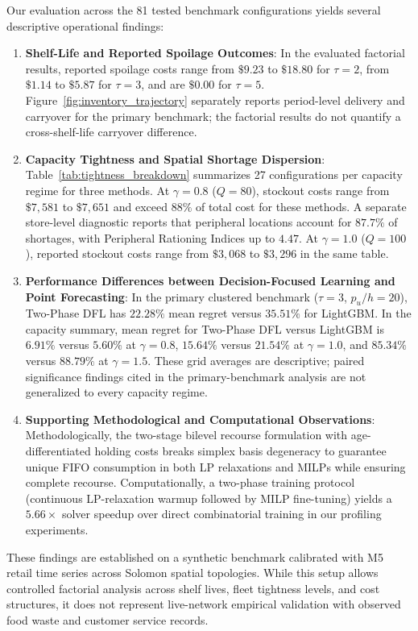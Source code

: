 \documentclass[11pt,a4paper]{article}
\theoremstyle{definition}
\theoremstyle{remark}
\begin{document}
Our evaluation across the 81 tested benchmark configurations yields several descriptive operational findings:
\begin{enumerate}[label=(\roman*)]
    \item \textbf{Shelf-Life and Reported Spoilage Outcomes}: In the evaluated factorial results, reported spoilage costs range from $\$9.23$ to $\$18.80$ for $\tau=2$, from $\$1.14$ to $\$5.87$ for $\tau=3$, and are $\$0.00$ for $\tau=5$. Figure~\ref{fig:inventory_trajectory} separately reports period-level delivery and carryover for the primary benchmark; the factorial results do not quantify a cross-shelf-life carryover difference.
    \item \textbf{Capacity Tightness and Spatial Shortage Dispersion}: Table~\ref{tab:tightness_breakdown} summarizes 27 configurations per capacity regime for three methods. At $\gamma=0.8$ ($Q=80$), stockout costs range from $\$7,581$ to $\$7,651$ and exceed $88\%$ of total cost for these methods. A separate store-level diagnostic reports that peripheral locations account for $87.7\%$ of shortages, with Peripheral Rationing Indices up to $4.47$. At $\gamma=1.0$ ($Q=100$), reported stockout costs range from $\$3,068$ to $\$3,296$ in the same table.
    \item \textbf{Performance Differences between Decision-Focused Learning and Point Forecasting}: In the primary clustered benchmark ($\tau=3$, $p_u/h=20$), Two-Phase DFL has $22.28\%$ mean regret versus $35.51\%$ for LightGBM. In the capacity summary, mean regret for Two-Phase DFL versus LightGBM is $6.91\%$ versus $5.60\%$ at $\gamma=0.8$, $15.64\%$ versus $21.54\%$ at $\gamma=1.0$, and $85.34\%$ versus $88.79\%$ at $\gamma=1.5$. These grid averages are descriptive; paired significance findings cited in the primary-benchmark analysis are not generalized to every capacity regime.
    \item \textbf{Supporting Methodological and Computational Observations}: Methodologically, the two-stage bilevel recourse formulation with age-differentiated holding costs breaks simplex basis degeneracy to guarantee unique FIFO consumption in both LP relaxations and MILPs while ensuring complete recourse. Computationally, a two-phase training protocol (continuous LP-relaxation warmup followed by MILP fine-tuning) yields a $5.66\times$ solver speedup over direct combinatorial training in our profiling experiments.
\end{enumerate}

These findings are established on a synthetic benchmark calibrated with M5 retail time series across Solomon spatial topologies. While this setup allows controlled factorial analysis across shelf lives, fleet tightness levels, and cost structures, it does not represent live-network empirical validation with observed food waste and customer service records.
\end{document}
